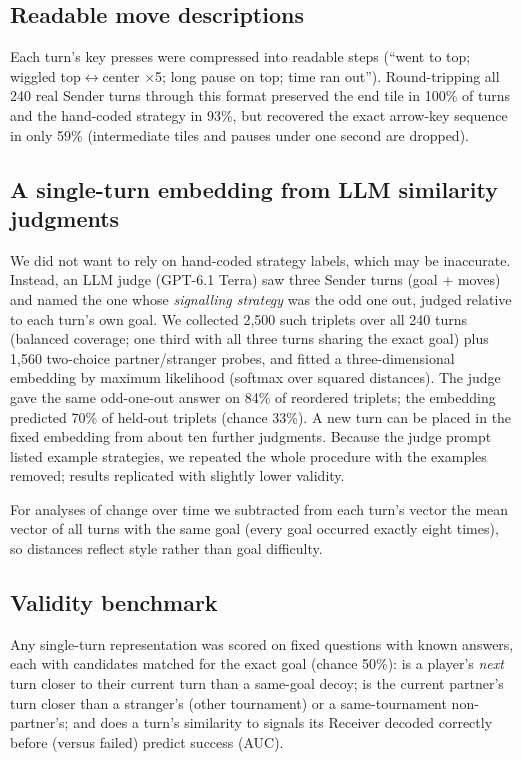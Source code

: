 \documentclass[11pt]{article}
\begin{document}
\subsection{Readable move descriptions}
Each turn's key presses were compressed into readable steps (``went to top; wiggled top$\leftrightarrow$center $\times$5; long pause on top; time ran out''). Round-tripping all 240 real Sender turns through this format preserved the end tile in 100\% of turns and the hand-coded strategy in 93\%, but recovered the exact arrow-key sequence in only 59\% (intermediate tiles and pauses under one second are dropped).

\subsection{A single-turn embedding from LLM similarity judgments}
We did not want to rely on hand-coded strategy labels, which may be inaccurate. Instead, an LLM judge (GPT-6.1 Terra) saw three Sender turns (goal + moves) and named the one whose \emph{signalling strategy} was the odd one out, judged relative to each turn's own goal. We collected 2{,}500 such triplets over all 240 turns (balanced coverage; one third with all three turns sharing the exact goal) plus 1{,}560 two-choice partner/stranger probes, and fitted a three-dimensional embedding by maximum likelihood (softmax over squared distances). The judge gave the same odd-one-out answer on 84\% of reordered triplets; the embedding predicted 70\% of held-out triplets (chance 33\%). A new turn can be placed in the fixed embedding from about ten further judgments. Because the judge prompt listed example strategies, we repeated the whole procedure with the examples removed; results replicated with slightly lower validity.

For analyses of change over time we subtracted from each turn's vector the mean vector of all turns with the same goal (every goal occurred exactly eight times), so distances reflect style rather than goal difficulty.

\subsection{Validity benchmark}
Any single-turn representation was scored on fixed questions with known answers, each with candidates matched for the exact goal (chance 50\%): is a player's \emph{next} turn closer to their current turn than a same-goal decoy; is the current partner's turn closer than a stranger's (other tournament) or a same-tournament non-partner's; and does a turn's similarity to signals its Receiver decoded correctly before (versus failed) predict success (AUC).
\end{document}
